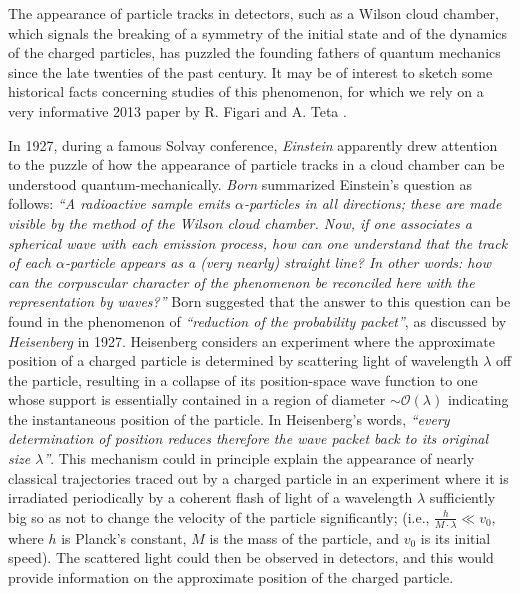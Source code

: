 \documentclass[11pt]{article}
\begin{document}
 The appearance of particle tracks in detectors, such as a Wilson cloud chamber, which signals the breaking of 
 a symmetry of the initial state and of the dynamics of the charged particles, has puzzled the founding fathers of 
 quantum mechanics since the late twenties of the past century. It may be of interest to sketch some historical facts 
 concerning studies of this phenomenon, for which we rely on a very informative 2013 paper by R. Figari and A. Teta \cite{FiTe}.  
 
 In 1927, during a famous Solvay conference, \textit{Einstein} apparently drew attention to the puzzle of how the appearance of 
 particle tracks in a cloud chamber can be understood quantum-mechanically. \textit{Born} summarized Einstein's question as follows: \textit{``A radioactive sample emits $\alpha$-particles in all directions; 
 these are made visible by the method of the Wilson cloud chamber. Now, if one associates a spherical wave with each 
 emission process, how can one understand that the track of each $\alpha$-particle appears as a (very nearly) straight line? 
 In other words: how can the corpuscular character of the phenomenon be reconciled here with the representation by waves?''} 
 Born suggested that the answer to this question can be found in the phenomenon of \textit{``reduction of the probability packet''}, 
 as discussed by \textit{Heisenberg} in 1927. Heisenberg considers an experiment where the approximate 
 position of a charged particle
  is determined by scattering light of wavelength $\lambda$ off the particle, resulting in a collapse of its 
  position-space wave function to one whose support is essentially contained in a region of diameter 
  $\sim \mathcal{O}(\lambda)$ indicating the instantaneous position of the particle. In Heisenberg's words, 
  \textit{``every determination of position reduces therefore the wave packet back to its original size $\lambda$''}. 
  This mechanism could in principle explain the appearance of nearly classical trajectories traced out by a charged particle 
  in an experiment where it is irradiated periodically by a coherent flash of light of a wavelength  
  $\lambda$ sufficiently big so as not to change the velocity of the particle significantly; 
  (i.e., $\frac{h}{M\cdot \lambda} \ll v_0$, where $h$ is Planck's constant, $M$ is the mass of the particle, and $v_0$ 
  is its initial speed). The scattered light could then be observed in detectors, and this would 
  provide information on the approximate position of the charged particle.
  
\end{document}
